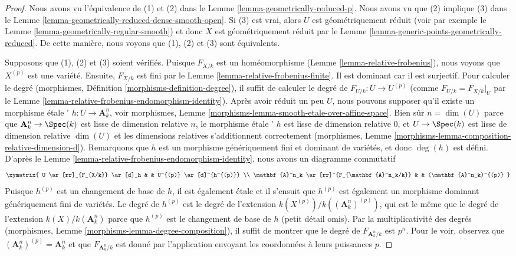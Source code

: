 \begin{proof}
Nous avons vu l'équivalence de (1) et (2) dans le
Lemme \ref{lemma-geometrically-reduced-p}. Nous avons
vu que (2) implique (3) dans le Lemme
\ref{lemma-geometrically-reduced-dense-smooth-open}. Si
(3) est vrai, alors $U$ est géométriquement réduit (voir
par exemple le Lemme
\ref{lemma-geometrically-regular-smooth}) et donc $X$ est
géométriquement réduit par le Lemme
\ref{lemma-generic-points-geometrically-reduced}. De cette manière, nous voyons que (1), (2) et (3) sont équivalents.

\medskip\noindent
Supposons que (1), (2) et (3) soient vérifiés. Puisque
$F_{X/k}$ est un homéomorphisme (Lemme
\ref{lemma-relative-frobenius}), nous voyons que $X^{(p)}$ est
une variété. Ensuite, $F_{X/k}$ est fini par le Lemme
\ref{lemma-relative-frobenius-finite}. Il est dominant car il
est surjectif. Pour calculer le degré (morphismes, Définition
\ref{morphisms-definition-degree}), il suffit de calculer le
degré de $F_{U/k} : U \to U^{(p)}$ (comme $F_{U/k} = F_{X/k}|_U$
par le Lemme
\ref{lemma-relative-frobenius-endomorphism-identity}). Après avoir
réduit un peu $U$, nous pouvons supposer qu'il existe un morphisme
étale \' $h : U \to \mathbf{A}^n_k$, voir morphismes, Lemme
\ref{morphisms-lemma-smooth-etale-over-affine-space}. Bien sûr $n =
\dim(U)$ parce que $\mathbf{A}^n_k \to \Spec(k)$ est lisse de
dimension relative $n$, le morphisme étale \' $h$ est lisse de
dimension relative $0$, et $U \to \Spec(k)$ est lisse de dimension
relative $\dim(U)$ et les dimensions relatives s'additionnent
correctement (morphismes, Lemme
\ref{morphisms-lemma-composition-relative-dimension-d}). Remarquons que $h$ est un
morphisme génériquement fini et dominant de variétés, et donc $\deg(h)$ est défini. D'après le
Lemme \ref{lemma-relative-frobenius-endomorphism-identity}, nous avons un diagramme commutatif
$$
\xymatrix{
U \ar[rr]_{F_{X/k}} \ar[d]_h & & U^{(p)} \ar[d]^{h^{(p)}} \\
\mathbf{A}^n_k \ar[rr]^{F_{\mathbf{A}^n_k/k}} & &
(\mathbf{A}^n_k)^{(p)}
}
$$
Puisque $h^{(p)}$ est un changement de base de $h$, il
est également \' étale et il s'ensuit que $h^{(p)}$ est
également un morphisme dominant génériquement fini de
variétés. Le degré de $h^{(p)}$ est le degré de
l'extension $k(X^{(p)})/k((\mathbf{A}^n_k)^{(p)})$, qui est
le même que le degré de l'extension
$k(X)/k(\mathbf{A}^n_k)$ parce que $h^{(p)}$ est le changement
de base de $h$ (petit détail omis). Par la multiplicativité des
degrés (morphismes, Lemme
\ref{morphisms-lemma-degree-composition}), il suffit de montrer que le
degré de $F_{\mathbf{A}^n_k/k}$ est $p^n$. Pour le voir, observez que
$(\mathbf{A}^n_k)^{(p)} = \mathbf{A}^n_k$ et que $F_{\mathbf{A}^n_k/k}$
est donné par l'application envoyant les coordonnées à leurs puissances $p$.
\end{proof}

